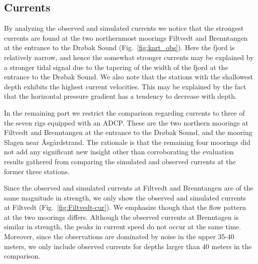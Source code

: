 \subsection{Currents}
\label{subsec:curree}


By analyzing the observed and simulated currents we notice that the strongest currents are found at the two northernmost moorings Filtvedt and Brenntangen at the entrance to the Dr{\o}bak Sound (Fig.~\ref{fig:kart_obs}). Here the fjord is relatively narrow, and hence the somewhat stronger currents may be explained by a stronger tidal signal due to the tapering of the width of the fjord at the entrance to the Dr{\o}bak Sound. We also note that the stations with the shallowest depth exhibits the highest current velocities. This may be explained by the fact that the horizontal pressure gradient has a tendency to decrease with depth.

In the remaining part we restrict the comparison regarding currents to three of the seven rigs equipped with an ADCP. These are the two northern moorings at Filtvedt and Brenntangen at the entrance to the Dr{\o}bak Sound, and the mooring Slagen near {\AA}sg\aa{}rdstrand. The rationale is that the remaining four moorings did not add any significant new insight other than corroborating the evaluation results gathered from comparing the simulated and observed currents at the former three stations.


Since the observed and simulated currents at Filtvedt and Brenntangen are of the same magnitude in strength, we only show the observed and simulated currents at Filtvedt (Fig.~\ref{fig:Filtvedt-cur}). We emphasize though that the flow pattern at the two moorings differs. Although the observed currents at Brenntagen is similar in strength, the peaks in current speed do not occur at the same time. Moreover, since the observations are dominated by noise in the upper 35-40 meters, we only include observed currents for depths larger than 40 meters in the comparison.

